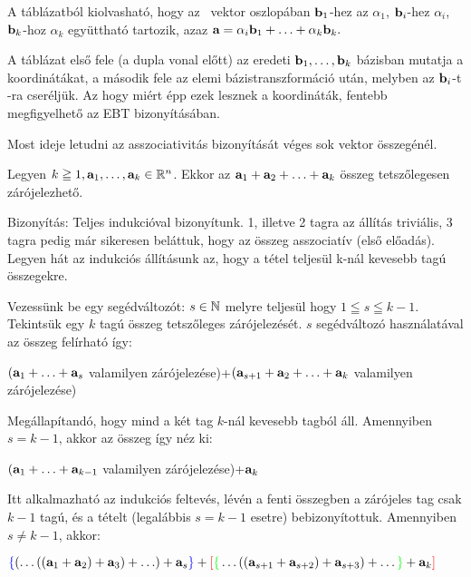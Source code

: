 \documentclass[a4paper,11.5pt]{article}
\begin{document}
	   A táblázatból kiolvasható, hogy az \a\ vektor oszlopában $\textbf{b}_1$-hez az $\alpha_1$, $\textbf{b}_i$-hez $\alpha_i$, $\textbf{b}_k$-hoz $\alpha_k$ együttható tartozik, azaz $\textbf{a}=\alpha_i\textbf{b}_1+\ldots+\alpha_k\textbf{b}_k.$
	
	   A táblázat első fele (a dupla vonal előtt) az eredeti $\textbf{b}_1,\ldots,\textbf{b}_k$ bázisban mutatja a koordinátákat, a második fele az elemi bázistranszformáció után, melyben az $\textbf{b}_i$-t \a-ra cseréljük. Az hogy miért épp ezek lesznek a koordináták, fentebb megfigyelhető az EBT bizonyításában.
	
	Most ideje letudni az asszociativitás bizonyítását véges sok vektor összegénél.
	\begin{theorem}
		Legyen $k\geqq 1, \textbf{a}_1, \ldots, \textbf{a}_k \in \mathbb{R}^n$. Ekkor az $\textbf{a}_1+\textbf{a}_2+\ldots+\textbf{a}_k$ összeg tetszőlegesen zárójelezhető.
		
		\noindent Bizonyítás: Teljes indukcióval bizonyítunk. 1, illetve 2 tagra az állítás triviális, 3 tagra pedig már sikeresen beláttuk, hogy az összeg asszociatív (első előadás). Legyen hát az indukciós állításunk az, hogy a tétel teljesül k-nál kevesebb tagú összegekre.
		
		\noindent Vezessünk be egy segédváltozót: $s\in\mathbb{N}$ melyre teljesül hogy $1\leqq s \leqq k-1$. Tekintsük egy $k$ tagú összeg tetszőleges zárójelezését. $s$ segédváltozó használatával az összeg felírható így:
		\begin{center}
			$ (\textbf{a}_1+\ldots+\textbf{a}_s$ valamilyen zárójelezése)+$(\textbf{a}_{s+1}+\textbf{a}_2+\ldots+\textbf{a}_k $ valamilyen zárójelezése)
		\end{center}
		\noindent
		Megállapítandó, hogy mind a két tag $k$-nál kevesebb tagból áll. Amennyiben $s=k-1$, akkor az összeg így néz ki:
		
		\begin{center}
			$ (\textbf{a}_1+\ldots+\textbf{a}_{k-1}$ valamilyen zárójelezése)+$\textbf{a}_k $
		\end{center}
		
		\noindent Itt alkalmazható az indukciós feltevés, lévén a fenti összegben a zárójeles tag csak $k-1$ tagú, és a tételt (legalábbis $s=k-1$ esetre) bebizonyítottuk. Amennyiben $s\not=k-1$, akkor:
		\begin{center}
			$ \textcolor{blue}{\{}
			(\ldots((\textbf{a}_1+\textbf{a}_2)+\textbf{a}_3)+\ldots)+\textbf{a}_s\textcolor{blue}{\}}+ \textcolor{red}{[}\textcolor{green}{\{}\ldots((\textbf{a}_{s+1}+\textbf{a}_{s+2})+\textbf{a}_{s+3})+\ldots\textcolor{green}{\}}+\textbf{a}_{k}\textcolor{red}{]}$
		\end{center}
		

\end{theorem}
\end{document}
